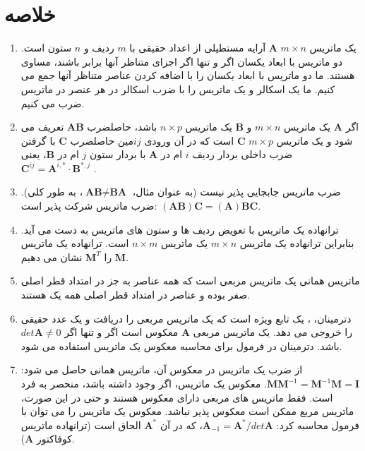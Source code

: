 \section{\textbf{خلاصه}}
\label{sec:2.9}
{
    \Large
    \begin{spacing}{1.5}
        \begin{enumerate}[label=\textbf{\arabic*}.]
            \item {یک ماتریس $m\times n$ $\textbf{A}$ آرایه مستطیلی از اعداد حقیقی با $m$ ردیف و $n$ ستون است.
            دو ماتریس با ابعاد یکسان اگر و تنها اگر اجزای متناظر آنها برابر باشند، مساوی هستند.
            ما دو ماتریس با ابعاد یکسان را با اضافه کردن عناصر متناظر آنها جمع می کنیم.
            ما یک اسکالر و یک ماتریس را با ضرب اسکالر در هر عنصر در ماتریس ضرب می کنیم.}

            \item {اگر $\textbf{A}$ یک ماتریس $m\times n$ و $\textbf{B}$ یک ماتریس $n\times p$ باشد،
            حاصلضرب $\textbf{AB}$ تعریف می شود و یک ماتریس $m\times p$ $\textbf{C}$ است
            که در آن ورودی $ij$مین حاصلضرب $\textbf{C}$ با گرفتن ضرب داخلی بردار ردیف $i$ ام در $\textbf{A}$ با بردار ستون $j$ ام در $\textbf{B}$، یعنی $\textbf{C}^{ij}=\textbf{A}^{i,*}\cdot\textbf{B}^{*,j}$ .}

            \item {ضرب ماتریس جابجایی پذیر نیست (به عنوان مثال، $\textbf{AB}\neq\textbf{BA}$، به طور کلی). ضرب ماتریس شرکت پذیر است: $(\textbf{AB})\textbf{C}=(\textbf{A})\textbf{BC}$.}

            \item {ترانهاده یک ماتریس با تعویض ردیف ها و ستون های ماتریس به دست می آید.
            بنابراین ترانهاده یک ماتریس $m\times n$ یک ماتریس $n\times m$ است.
            ترانهاده یک ماتریس $\textbf{M}$ را $\textbf{M}^{T}$ نشان می دهیم.}

            \item {ماتریس همانی یک ماتریس مربعی است که همه عناصر به جز در امتداد قطر اصلی صفر بوده و عناصر در امتداد قطر اصلی همه یک هستند.}

            \item {دترمینان، ، یک تابع ویژه است که یک ماتریس مربعی را دریافت و یک عدد حقیقی را خروجی می دهد.
            یک ماتریس مربعی $\textbf{A}$ معکوس است اگر و تنها اگر $det\textbf{A}\neq 0$ باشد.
            دترمینان در فرمول برای محاسبه معکوس یک ماتریس استفاده می شود.}

            \item {از ضرب یک ماتریس در معکوس آن، ماتریس همانی حاصل می شود: $\textbf{M}\textbf{M}^{-1}=\textbf{M}^{-1}\textbf{M}=\textbf{I}$.
            معکوس یک ماتریس، اگر وجود داشته باشد، منحصر به فرد است.
            فقط ماتریس های مربعی دارای معکوس هستند و حتی در این صورت، ماتریس مربع ممکن است معکوس پذیر نباشد.
            معکوس یک ماتریس را می توان با فرمول محاسبه کرد: $\textbf{A}_{-1}=\textbf{A}^{*}/det\textbf{A}$، که در آن $\textbf{A}^{*}$ الحاق است (ترانهاده ماتریس کوفاکتور $\textbf{A}$).}


\end{enumerate}
\end{spacing}}
